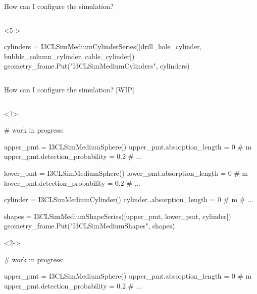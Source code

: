 \begin{frame}[t,fragile]{How can I configure the simulation?}
\begin{column}[t]{0.6\textwidth}
    \begin{onlyenv}<5->
      \begin{python}
        cylinders = I3CLSimMediumCylinderSeries([drill_hole_cylinder, bubble_column_cylinder, cable_cylinder])
        geometry_frame.Put("I3CLSimMediumCylinders", cylinders)
      \end{python}
    \end{onlyenv}
    
  \end{column}
\end{frame}

\begin{frame}[t,fragile]{How can I configure the simulation? [WIP]}
  \begin{column}[t]{0.37\textwidth}
    
    \vspace{0.5cm}

  \end{column}
  \begin{column}[t]{0.6\textwidth}
    \vspace*{-5cm}
    
    \begin{onlyenv}<1>
      \begin{python}
        # work in progress:
        
        upper_pmt = I3CLSimMediumSphere()
        upper_pmt.absorption_length = 0 # m
        upper_pmt.detection_probability = 0.2
        # ...
        
        lower_pmt = I3CLSimMediumSphere()
        lower_pmt.absorption_length = 0 # m
        lower_pmt.detection_probability = 0.2
        # ...
        
        cylinder = I3CLSimMediumCylinder()
        cylinder..absorption_length = 0 # m
        # ...
        
        shapes = I3CLSimMediumShapeSeries([upper_pmt, lower_pmt, cylinder])
        geometry_frame.Put("I3CLSimMediumShapes", shapes)
      \end{python}
    \end{onlyenv}
    
    \begin{onlyenv}<2->
      \begin{python}
        # work in progress:
        
        upper_pmt = I3CLSimMediumSphere()
        upper_pmt.absorption_length = 0 # m
        upper_pmt.detection_probability = 0.2
        # ...
        

\end{python}
\end{onlyenv}
\end{column}
\end{frame}
